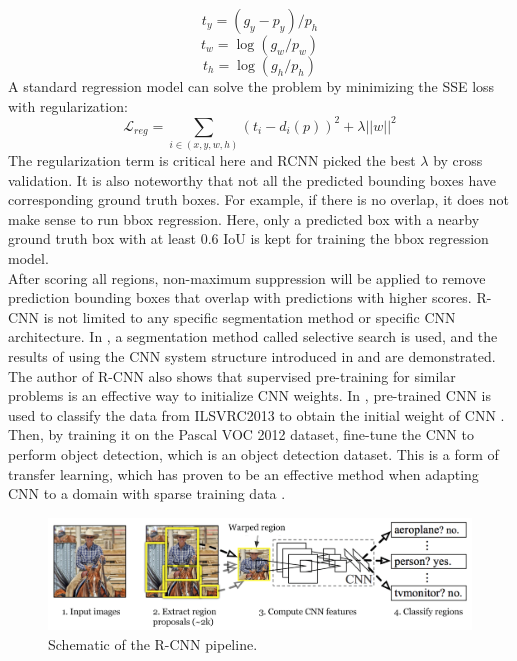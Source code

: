 \begin{equation}
	t_y=(g_y-p_y )/p_h
\end{equation}
\begin{equation}
	t_w=\log{(g_w/p_w)} 
\end{equation}
\begin{equation}
	t_h=\log{(g_h/p_h)} 
\end{equation}
A standard regression model can solve the problem by minimizing the SSE loss with regularization:
\begin{equation}
	\mathcal{L}_{reg} = \sum_{i \in (x,y,w,h)}(t_i-d_i(p))^2 + \lambda||w||^2
\end{equation}
The regularization term is critical here and RCNN picked the best \(\lambda\) by cross validation. It is also noteworthy that not all the predicted bounding boxes have corresponding ground truth boxes. For example, if there is no overlap, it does not make sense to run bbox regression. Here, only a predicted box with a nearby ground truth box with at least 0.6 IoU is kept for training the bbox regression model.
\\After scoring all regions, non-maximum suppression will be applied to remove prediction bounding boxes that overlap with predictions with higher scores. R-CNN is not limited to any specific segmentation method or specific CNN architecture. In \cite{DBLP:journals/corr/GirshickDDM13}, a segmentation method called selective search \cite{6126456} is used, and the results of using the CNN system structure introduced in \cite{10.1145/3065386} and \cite{Simonyan2015VeryDC} are demonstrated.
\\The author of R-CNN also shows that supervised pre-training for similar problems is an effective way to initialize CNN weights. In \cite{DBLP:journals/corr/GirshickDDM13}, pre-trained CNN is used to classify the data from ILSVRC2013 to obtain the initial weight of CNN \cite{DBLP:journals/corr/RussakovskyDSKSMHKKBBF14}. Then, by training it on the Pascal VOC 2012 dataset, fine-tune the CNN to perform object detection, which is an object detection dataset. This is a form of transfer learning, which has proven to be an effective method when adapting CNN to a domain with sparse training data \cite{DBLP:journals/corr/abs-1808-01974}.
\begin{figure}
	\centerline{\includegraphics[width=1\linewidth]{Figs/rcnnSche.png}}
	\caption{Schematic of the R-CNN pipeline.}
	\label{fig:rcnnSche}
\end{figure}
